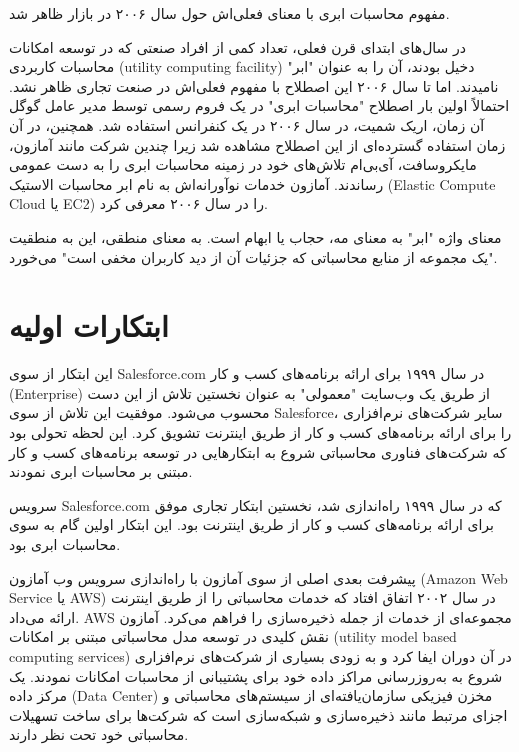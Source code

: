 \documentclass{book}
\begin{document}
            \begin{addinfo}
                
                مفهوم محاسبات ابری با معنای فعلی‌اش حول سال ۲۰۰۶ در بازار ظاهر شد.
                
            \end{addinfo}

            در سال‌های ابتدای قرن فعلی، تعداد کمی از افراد صنعتی که در توسعه امکانات محاسبات کاربردی (utility computing facility) دخیل بودند، آن را به عنوان "ابر" نامیدند. اما تا سال ۲۰۰۶ این اصطلاح با مفهوم فعلی‌اش در صنعت تجاری ظاهر نشد. احتمالاً اولین بار اصطلاح "محاسبات ابری" در یک فروم رسمی توسط مدیر عامل گوگل آن زمان، اریک شمیت، در سال ۲۰۰۶ در یک کنفرانس استفاده شد. همچنین، در آن زمان استفاده گسترده‌ای از این اصطلاح مشاهده شد زیرا چندین شرکت مانند آمازون، مایکروسافت، آی‌بی‌ام تلاش‌های خود در زمینه محاسبات ابری را به دست عمومی رساندند. آمازون خدمات نوآورانه‌اش به نام ابر محاسبات الاستیک (Elastic Compute Cloud یا EC2) را در سال ۲۰۰۶ معرفی کرد.

            معنای واژه "ابر" به معنای مه، حجاب یا ابهام است. به معنای منطقی، این به منطقیت "یک مجموعه از منابع محاسباتی که جزئیات آن از دید کاربران مخفی است" می‌خورد.


        \section{ابتکارات اولیه}

            این ابتکار از سوی Salesforce.com در سال ۱۹۹۹ برای ارائه برنامه‌های کسب و کار (Enterprise) از طریق یک وب‌سایت "معمولی" به عنوان نخستین تلاش از این دست محسوب می‌شود. موفقیت این تلاش از سوی Salesforce، سایر شرکت‌های نرم‌افزاری را برای ارائه برنامه‌های کسب و کار از طریق اینترنت تشویق کرد. این لحظه تحولی بود که شرکت‌های فناوری محاسباتی شروع به ابتکار‌هایی در توسعه برنامه‌های کسب و کار مبتنی بر محاسبات ابری نمودند.

            \begin{addinfo}
                
                سرویس Salesforce.com که در سال ۱۹۹۹ راه‌اندازی شد، نخستین ابتکار تجاری موفق برای ارائه برنامه‌های کسب و کار از طریق اینترنت بود. این ابتکار اولین گام به سوی محاسبات ابری بود.

            \end{addinfo}

            پیشرفت بعدی اصلی از سوی آمازون با راه‌اندازی سرویس وب آمازون (Amazon Web Service یا AWS) در سال ۲۰۰۲ اتفاق افتاد که خدمات محاسباتی را از طریق اینترنت ارائه می‌داد. AWS مجموعه‌ای از خدمات از جمله ذخیره‌سازی را فراهم می‌کرد. آمازون نقش کلیدی در توسعه مدل محاسباتی مبتنی بر امکانات (utility model based computing services) در آن دوران ایفا کرد و به زودی بسیاری از شرکت‌های نرم‌افزاری شروع به به‌روزرسانی مراکز داده خود برای پشتیبانی از محاسبات امکانات نمودند. یک مرکز داده (Data Center) مخزن فیزیکی سازمان‌یافته‌ای از سیستم‌های محاسباتی و اجزای مرتبط مانند ذخیره‌سازی و شبکه‌سازی است که شرکت‌ها برای ساخت تسهیلات محاسباتی خود تحت نظر دارند.
\end{document}
